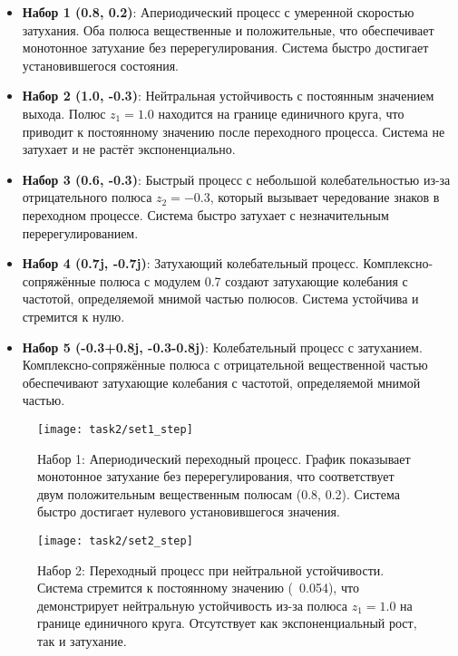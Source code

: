 \begin{itemize}
  \item \textbf{Набор 1 (0.8, 0.2)}: Апериодический процесс с умеренной скоростью затухания. Оба полюса вещественные и положительные, что обеспечивает монотонное затухание без перерегулирования. Система быстро достигает установившегося состояния.
  
  \item \textbf{Набор 2 (1.0, -0.3)}: Нейтральная устойчивость с постоянным значением выхода. Полюс $z_1 = 1.0$ находится на границе единичного круга, что приводит к постоянному значению после переходного процесса. Система не затухает и не растёт экспоненциально.
  
  \item \textbf{Набор 3 (0.6, -0.3)}: Быстрый процесс с небольшой колебательностью из-за отрицательного полюса $z_2 = -0.3$, который вызывает чередование знаков в переходном процессе. Система быстро затухает с незначительным перерегулированием.
  
  \item \textbf{Набор 4 (0.7j, -0.7j)}: Затухающий колебательный процесс. Комплексно-сопряжённые полюса с модулем 0.7 создают затухающие колебания с частотой, определяемой мнимой частью полюсов. Система устойчива и стремится к нулю.
  
  \item \textbf{Набор 5 (-0.3+0.8j, -0.3-0.8j)}: Колебательный процесс с затуханием. Комплексно-сопряжённые полюса с отрицательной вещественной частью обеспечивают затухающие колебания с частотой, определяемой мнимой частью.
\end{itemize}

\begin{figure}[H]
  \centering
  \texttt{[image: task2/set1\_step]}
  \caption{Набор 1: Апериодический переходный процесс. График показывает монотонное затухание без перерегулирования, что соответствует двум положительным вещественным полюсам (0.8, 0.2). Система быстро достигает нулевого установившегося значения.}
  \label{fig:task2_set1}
\end{figure}

\begin{figure}[H]
  \centering
  \texttt{[image: task2/set2\_step]}
  \caption{Набор 2: Переходный процесс при нейтральной устойчивости. Система стремится к постоянному значению (~0.054), что демонстрирует нейтральную устойчивость из-за полюса $z_1 = 1.0$ на границе единичного круга. Отсутствует как экспоненциальный рост, так и затухание.}
  \label{fig:task2_set2}
\end{figure}


